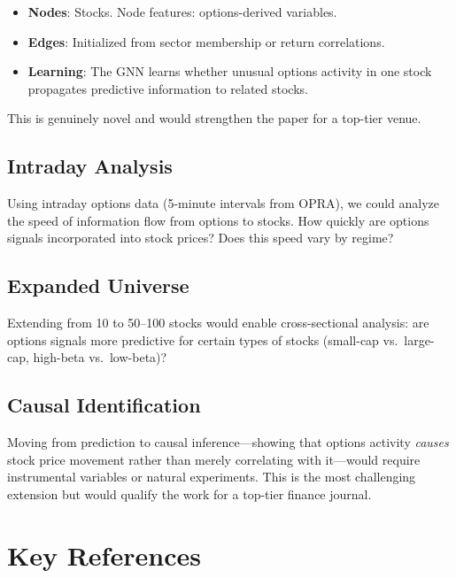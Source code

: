 \documentclass[11pt,a4paper]{article}
\begin{document}
\begin{itemize}[nosep]
    \item \textbf{Nodes}: Stocks. Node features: options-derived variables.
    \item \textbf{Edges}: Initialized from sector membership or return correlations.
    \item \textbf{Learning}: The GNN learns whether unusual options activity in one stock propagates predictive information to related stocks.
\end{itemize}

This is genuinely novel and would strengthen the paper for a top-tier venue.

\subsection{Intraday Analysis}

Using intraday options data (5-minute intervals from OPRA), we could analyze the speed of information flow from options to stocks. How quickly are options signals incorporated into stock prices? Does this speed vary by regime?

\subsection{Expanded Universe}

Extending from 10 to 50--100 stocks would enable cross-sectional analysis: are options signals more predictive for certain types of stocks (small-cap vs.\ large-cap, high-beta vs.\ low-beta)?

\subsection{Causal Identification}

Moving from prediction to causal inference---showing that options activity \emph{causes} stock price movement rather than merely correlating with it---would require instrumental variables or natural experiments. This is the most challenging extension but would qualify the work for a top-tier finance journal.


\section{Key References}
\end{document}
